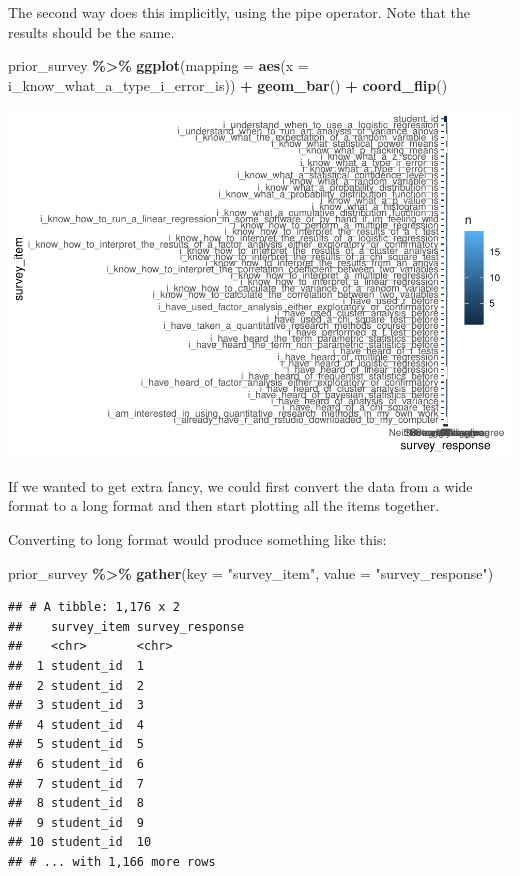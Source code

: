 \documentclass[
]{book}
\newenvironment{Shaded}{\begin{snugshade}}{\end{snugshade}}
\newcommand{\DataTypeTok}[1]{\textcolor[rgb]{0.13,0.29,0.53}{#1}}
\newcommand{\KeywordTok}[1]{\textcolor[rgb]{0.13,0.29,0.53}{\textbf{#1}}}
\newcommand{\NormalTok}[1]{#1}
\newcommand{\OperatorTok}[1]{\textcolor[rgb]{0.81,0.36,0.00}{\textbf{#1}}}
\newcommand{\StringTok}[1]{\textcolor[rgb]{0.31,0.60,0.02}{#1}}
\begin{document}
The second way does this implicitly, using the pipe operator. Note that the results should be the same.

\begin{Shaded}
\begin{Highlighting}[]
\NormalTok{prior\_survey }\OperatorTok{\%\textgreater{}\%}\StringTok{ }
\StringTok{  }\KeywordTok{ggplot}\NormalTok{(}\DataTypeTok{mapping =} \KeywordTok{aes}\NormalTok{(}\DataTypeTok{x =}\NormalTok{ i\_know\_what\_a\_type\_i\_error\_is)) }\OperatorTok{+}
\StringTok{  }\KeywordTok{geom\_bar}\NormalTok{() }\OperatorTok{+}
\StringTok{  }\KeywordTok{coord\_flip}\NormalTok{()}
\end{Highlighting}
\end{Shaded}

\includegraphics{test_course_notes_files/figure-latex/unnamed-chunk-10-1.pdf}

If we wanted to get extra fancy, we could first convert the data from a wide format to a long format and then start plotting all the items together.

Converting to long format would produce something like this:

\begin{Shaded}
\begin{Highlighting}[]
\NormalTok{prior\_survey }\OperatorTok{\%\textgreater{}\%}\StringTok{ }
\StringTok{  }\KeywordTok{gather}\NormalTok{(}\DataTypeTok{key =} \StringTok{"survey\_item"}\NormalTok{, }\DataTypeTok{value =} \StringTok{"survey\_response"}\NormalTok{)}
\end{Highlighting}
\end{Shaded}

\begin{verbatim}
## # A tibble: 1,176 x 2
##    survey_item survey_response
##    <chr>       <chr>          
##  1 student_id  1              
##  2 student_id  2              
##  3 student_id  3              
##  4 student_id  4              
##  5 student_id  5              
##  6 student_id  6              
##  7 student_id  7              
##  8 student_id  8              
##  9 student_id  9              
## 10 student_id  10             
## # ... with 1,166 more rows
\end{verbatim}
\end{document}
